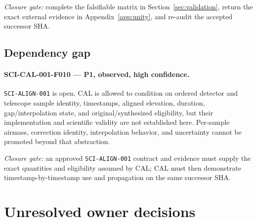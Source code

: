 \documentclass[11pt]{article}
\newcommand{\code}[1]{\nolinkurl{#1}}
\begin{document}
\emph{Closure gate:} complete the falsifiable matrix in
Section~\ref{sec:validation}, return the exact external evidence in
Appendix~\ref{app:unity}, and re-audit the accepted successor SHA.

\subsection{Dependency gap}

\paragraph{SCI-CAL-001-F010 --- P1, observed, high confidence.}
\code{SCI-ALIGN-001} is open.  CAL is allowed to condition on ordered detector
and telescope sample identity, timestamps, aligned elevation, duration,
gap/interpolation state, and original/synthesized eligibility, but their
implementation and scientific validity are not established here.  Per-sample
airmass, correction identity, interpolation behavior, and uncertainty cannot
be promoted beyond that abstraction.

\emph{Closure gate:} an approved \code{SCI-ALIGN-001} contract and evidence
must supply the exact quantities and eligibility assumed by CAL; CAL must then
demonstrate timestamp-by-timestamp use and propagation on the same successor
SHA.

\section{Unresolved owner decisions}
\end{document}
